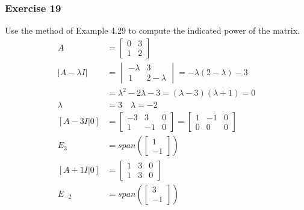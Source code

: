 \documentclass{math}
\begin{document}
\subsubsection*{Exercise 19}
Use the method of Example 4.29 to compute the indicated power of the matrix.
\begin{align*}
  A &= \begin{bmatrix}
    0 & 3 \\
    1 & 2
  \end{bmatrix} \\
  |A-\lambda I| &= \begin{vmatrix}
    -\lambda & 3 \\
    1 & 2-\lambda
  \end{vmatrix} = -\lambda(2-\lambda)-3 \\
  &= \lambda^2-2\lambda-3 = (\lambda-3)(\lambda+1) = 0 \\
  \lambda &= 3 \quad \lambda = -2 \\
  [A-3I|0] &= \begin{bmatrix}
    -3 & 3 & 0 \\
    1 & -1 & 0
  \end{bmatrix} = \begin{bmatrix}
    1 & -1 & 0 \\
    0 & 0 & 0
  \end{bmatrix} \\
  E_3 &= span\left(\begin{bmatrix}1 \\ -1\end{bmatrix}\right) \\
  [A+1I|0] &= \begin{bmatrix}
    1 & 3 & 0 \\
    1 & 3 & 0
  \end{bmatrix} \\
  E_{-2} &= span\left(\begin{bmatrix}3 \\ -1\end{bmatrix}\right)
\end{align*}
\end{document}
